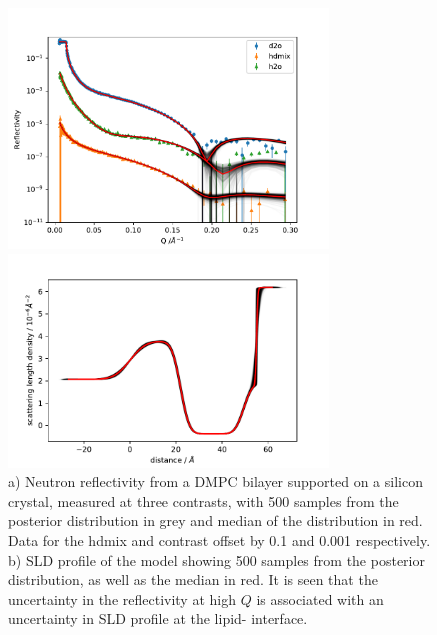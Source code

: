 \documentclass[pdf,preprint]{iucr}
\begin{document}
\begin{figure}
\centering
\label{fig:global_fit}%
\includegraphics[width=85mm]{./supporting_information/global_fit.pdf}%


\includegraphics[width=85mm]{./supporting_information/d2o_sld_spread.pdf}

\caption{a) Neutron reflectivity from a DMPC bilayer supported on a silicon crystal, measured at three contrasts, with 500 samples from the posterior distribution in grey and median of the distribution in red. Data for the hdmix and  contrast offset by 0.1 and 0.001 respectively. b) SLD profile of the  model showing 500 samples from the posterior distribution, as well as the median in red. It is seen that the uncertainty in the reflectivity at high $Q$ is associated with an uncertainty in SLD profile at the lipid- interface.}
\end{figure}
\end{document}
